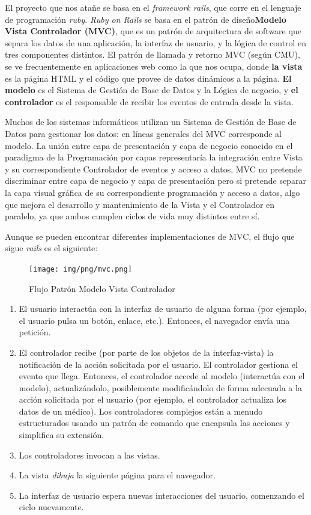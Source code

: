 \documentclass[a4paper,oneside,11pt]{book}
\begin{document}
			El proyecto que nos atañe se basa en el \textit{framework rails}, que corre en el lenguaje de programación \textit{ruby}. \textit{Ruby on Rails} se basa en el patrón de diseño\textbf{Modelo Vista Controlador (MVC)}, que es un patrón de arquitectura de software que separa los datos de una aplicación, la interfaz de usuario, y la lógica de control en tres componentes distintos. El patrón de llamada y retorno MVC (según CMU), se ve frecuentemente en aplicaciones web como la que nos ocupa, donde \textbf{la vista} es la página HTML y el código que provee de datos dinámicos a la página. \textbf{El modelo} es el Sistema de Gestión de Base de Datos y la Lógica de negocio, y \textbf{el controlador} es el responsable de recibir los eventos de entrada desde la vista. 	

			Muchos de los sistemas informáticos utilizan un Sistema de Gestión de Base de Datos para gestionar los datos: en líneas generales del MVC corresponde al modelo. La unión entre capa de presentación y capa de negocio conocido en el paradigma de la Programación por capas representaría la integración entre Vista y su correspondiente Controlador de eventos y acceso a datos, MVC no pretende discriminar entre capa de negocio y capa de presentación pero si pretende separar la capa visual gráfica de su correspondiente programación y acceso a datos, algo que mejora el desarrollo y mantenimiento de la Vista y el Controlador en paralelo, ya que ambos cumplen ciclos de vida muy distintos entre sí.

			Aunque se pueden encontrar diferentes implementaciones de MVC, el flujo que sigue \textit{rails} es el siguiente:

			\begin{figure}[H]
			  \centering
			    \texttt{[image: img/png/mvc.png]}
			  \caption{Flujo Patrón Modelo Vista Controlador}
			  \label{fig:patron_mvc}
			\end{figure}

			\begin{enumerate}
				\item El usuario interactúa con la interfaz de usuario de alguna forma (por ejemplo, el usuario pulsa un botón, enlace, etc.). Entonces, el navegador envía una petición.
				\item El controlador recibe (por parte de los objetos de la interfaz-vista) la notificación de la acción solicitada por el usuario. El controlador gestiona el evento que llega. Entonces, el controlador accede al modelo (interactúa con el modelo), actualizándolo, posiblemente modificándolo de forma adecuada a la acción solicitada por el usuario (por ejemplo, el controlador actualiza los datos de un médico). Los controladores complejos están a menudo estructurados usando un patrón de comando que encapsula las acciones y simplifica su extensión.
				\item Los controladores invocan a las vistas.
				\item La vista \textit{dibuja} la siguiente página para el navegador.
				\item La interfaz de usuario espera nuevas interacciones del usuario, comenzando el ciclo nuevamente.
			\end{enumerate}
\end{document}
